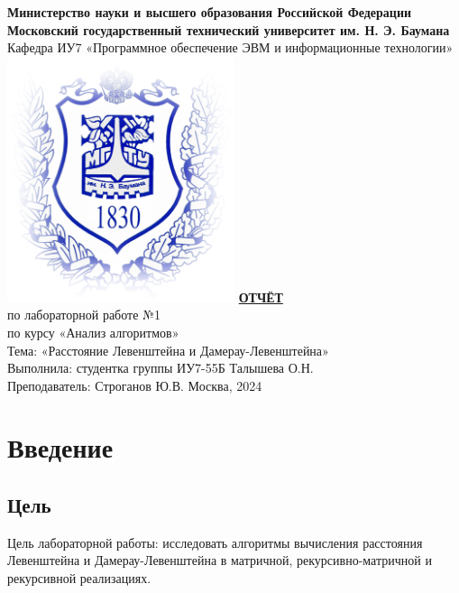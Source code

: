 \documentclass[a4paper,12pt]{article}
\begin{document}
\begin{titlepage}
    \centering
    {\bfseries Министерство науки и высшего образования Российской Федерации}\\
    {\bfseries Московский государственный технический университет им. Н. Э. Баумана}\\
    Кафедра ИУ7 «Программное обеспечение ЭВМ и информационные технологии» \\
    \vfill
    \includegraphics[width=0.5\textwidth]{gerb.png} %
    \vfill
    {\fontsize{17}{22}\selectfont \textbf{\underline{ОТЧЁТ}}}\\[0.5cm]
    {\fontsize{14.4}{20}\selectfont по лабораторной работе №1\\
    по курсу «Анализ алгоритмов»\\
    Тема: «Расстояние Левенштейна и Дамерау-Левенштейна»}\\
    \vfill
    Выполнила: студентка группы ИУ7-55Б Талышева О.Н.\\
    Преподаватель: Строганов Ю.В.
    \vfill
    Москва, 2024
\end{titlepage}

\tableofcontents
\newpage

\section*{Введение}
\subsection*{Цель}
Цель лабораторной работы: исследовать алгоритмы вычисления расстояния Левенштейна и Дамерау-Левенштейна в матричной, рекурсивно-матричной и рекурсивной реализациях.
\end{document}
